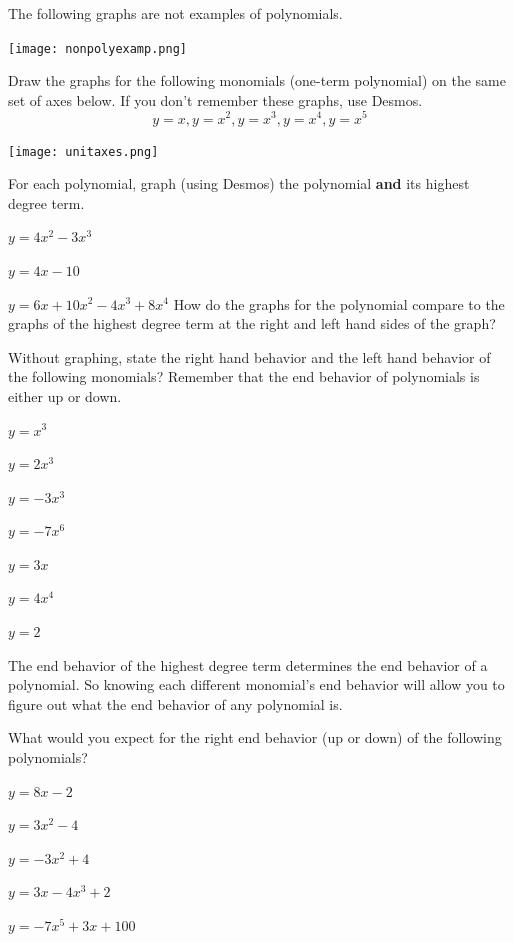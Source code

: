The following graphs are not examples of polynomials.

\begin{center} \texttt{[image: nonpolyexamp.png]} \end{center}


\bq Draw the graphs for the following monomials (one-term polynomial) on the same set of axes below. If you don't remember these graphs, use Desmos.
$$ y=x, y=x^2, y=x^3, y=x^4, y=x^5$$

\begin{center} \texttt{[image: unitaxes.png]} \end{center}

\eq

\bq For each polynomial, graph (using Desmos) the polynomial \textbf{and} its highest degree term.
\be
\item $y=4x^2-3x^3$
\item $y=4x-10$
\item $y=6x+10x^2-4x^3+8x^4$
\ee
How do the graphs for the polynomial compare to the graphs of the highest degree term at the right and left hand sides of the graph?
\eq

\bq Without graphing, state the right hand behavior and the left hand behavior of the following monomials? Remember that the end behavior of polynomials is either up or down.
\be
\item $y=x^3$
\item $y=2x^3$
\item $y=-3x^3$
\item $y=-7x^6$
\item $y=3x$
\item $y=4x^4$
\item $y=2$
\ee \eq

\begin{info}
The end behavior of the highest degree term determines the end behavior of a polynomial. So knowing each different monomial's end behavior will allow you to figure out what the end behavior of any polynomial is.
\end{info}


\bq What would you expect for the right end behavior (up or down) of the following polynomials?
\be
\item$y= 8x-2$
\item $y=3x^2-4$
\item $y=-3x^2+4$
\item $y=3x-4x^3+2$
\item $y=-7x^5+3x+100$
\ee
\eq

